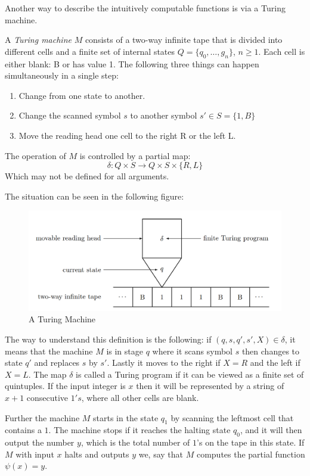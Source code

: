 \documentclass[../main.tex]{subfiles}
\begin{document}
Another way to describe the intuitively computable functions is via a Turing
machine. 
\begin{defi}
	A \textit{Turing machine} $M$ consists of a two-way infinite tape that
	is divided into different cells and a finite set of internal states $Q=\{
	q_0,\ldots, g_n\}$, $n\geq 1$. Each cell  is either blank: B or has
	value 1.
	The following three things can happen simultaneously in a single
	step:
	\begin{enumerate}
		\item Change from one state to another.
		\item Change the scanned symbol $s$ to another symbol
			$s'\in S=\{1,B\}$
		\item Move the reading head one cell to the right R or the left
			L.
	\end{enumerate}
	The operation of $M$ is controlled by a partial map:
	$$\delta:Q\times S\rightarrow Q\times S\times\{R,L\}$$
	Which may not be defined for all arguments.
\end{defi}
The situation can be seen in the following figure:
\begin{center}
	\begin{figure}[h]
\includegraphics[width=\textwidth]{Turnig.png}
\caption[asd]{A Turing Machine\footnotemark}
\end{figure}
\end{center}
The way to understand this definition is the following: if
$(q,s,q',s',X)\in\delta$, it means that the machine $M$ is in stage $q$ where it
scans symbol $s$ then changes to state $q'$ and replaces $s$ by $s'$. Lastly it
moves to the right if $X=R$ and the left if $X=L$. The map $\delta$ is called a
Turing program if it can be viewed as a finite set of quintuples. If the input
integer is $x$ then it will be represented by a string of $x+1$ consecutive
$1's$, where all other cells are blank.

Further the machine $M$ starts in the state $q_1$ by scanning the leftmost cell
that contains a $1$. The machine stops if it reaches the halting state $q_0$,
and it will then output the number $y$, which is the total number of $1$'s on
the tape in this state. If $M$ with input $x$ halts and outputs $y$ we,
say that $M$ computes the partial function $\psi(x)=y$.
\end{document}
